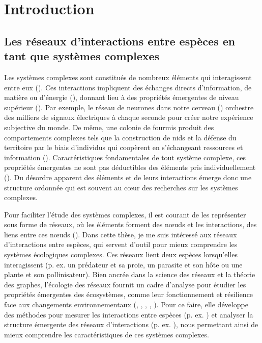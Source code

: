 
\francais   
\doublespacing
\chapter*{Introduction}



\section{Les réseaux d'interactions entre espèces en tant que systèmes complexes}

Les systèmes complexes sont constitués de nombreux éléments qui interagissent
entre eux (\cite{Rind1999Complexity}). Ces interactions impliquent des échanges
directs d'information, de matière ou d'énergie (\cite{Ladyman2013What}), donnant
lieu à des propriétés émergentes de niveau supérieur
(\cite{Foote2007Mathematics}). Par exemple, le réseau de neurones dans notre
cerveau (\cite{Sporns2011Human}) orchestre des milliers de signaux électriques à
chaque seconde pour créer notre expérience subjective du monde. De même, une
colonie de fourmis produit des comportements complexes tels que la construction
de nids et la défense du territoire par le biais d'individus qui coopèrent en
s'échangeant ressources et information (\cite{Bonabeau1999Swarm}).
Caractéristiques fondamentales de tout système complexe, ces propriétés
émergentes ne sont pas déductibles des éléments pris individuellement
(\cite{Nielsen2000Emergent}). Du désordre apparent des éléments et de leurs
interactions émerge donc une structure ordonnée qui est souvent au cœur des
recherches sur les systèmes complexes. 

Pour faciliter l'étude des systèmes complexes, il est courant de les représenter
sous forme de réseaux, où les éléments forment des nœuds et les interactions,
des liens entre ces nœuds (\cite{Newman2003Structure}). Dans cette thèse, je me
suis intéressé aux réseaux d'interactions entre espèces, qui servent d'outil
pour mieux comprendre les systèmes écologiques complexes. Ces réseaux lient deux
espèces lorsqu'elles interagissent (p. ex. un prédateur et sa proie, un parasite
et son hôte ou une plante et son pollinisateur). Bien ancrée dans la science des
réseaux et la théorie des graphes, l'écologie des réseaux fournit un cadre
d'analyse pour étudier les propriétés émergentes des écosystèmes, comme leur
fonctionnement et résilience face aux changements environnementaux
(\cite{Proulx2005Network}, \cite{McCann2007Protecting}, \cite{McCann2011Food},
\cite{Rooney2012Integrating}, \cite{Valiente-Banuet2019Species}). Pour ce faire,
elle développe des méthodes pour mesurer les interactions entre espèces (p. ex.
\cite{Jordano2016Sampling}) et analyser la structure émergente des réseaux
d'interactions (p. ex. \cite{Delmas2019Analysing}), nous permettant ainsi de
mieux comprendre les caractéristiques de ces systèmes complexes. 

